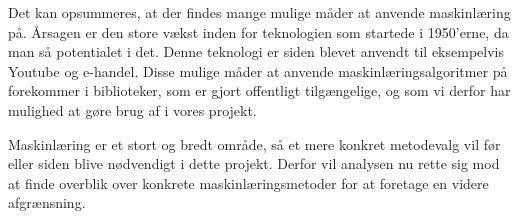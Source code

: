 \par
Det kan opsummeres, at der findes mange mulige måder at anvende maskinlæring på. Årsagen er den store vækst inden for teknologien som startede i 1950'erne, da man så potentialet i det. Denne teknologi er siden blevet anvendt til eksempelvis Youtube og e-handel. Disse mulige måder at anvende maskinlæringsalgoritmer på forekommer i biblioteker, som er gjort offentligt tilgængelige, og som vi derfor har mulighed at gøre brug af i vores projekt.


Maskinlæring er et stort og bredt område, så et mere konkret metodevalg vil før eller siden blive nødvendigt i dette projekt. Derfor vil analysen nu rette sig mod at finde overblik over konkrete maskinlæringsmetoder for at foretage en videre afgrænsning. 

